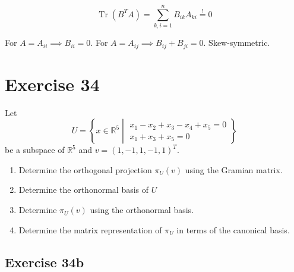 \documentclass[a4paper]{article}
\theoremstyle{definition}
\DeclareMathOperator\Tr{Tr}
\newcommand\set[1]{\left\{#1\right\}}
\begin{document}
\[ \Tr(B^T A) = \sum_{k,i=1}^n B_{ik} A_{ki} \overset!= 0 \]

For $A = A_{ii} \implies B_{ii} = 0$.
For $A = A_{ij} \implies B_{ij} + B_{ji} = 0$.
Skew-symmetric.

\section{Exercise 34}
\begin{ex}
  Let
  \[ U = \set{x \in \mathbb R^5 \middle| \substack{x_1 - x_2 + x_3 - x_4 + x_5 = 0 \\ x_1 + x_3 + x_5 = 0}} \]
  be a subspace of $\mathbb R^5$ and $v = (1,-1,1,-1,1)^T$.
  \begin{enumerate}
    \item Determine the orthogonal projection $\pi_U(v)$ using the Gramian matrix.
    \item Determine the orthonormal basis of $U$
    \item Determine $\pi_U(v)$ using the orthonormal basis.
    \item Determine the matrix representation of $\pi_U$ in terms of the canonical basis.
  \end{enumerate}
\end{ex}

\subsection{Exercise 34b}
\end{document}
